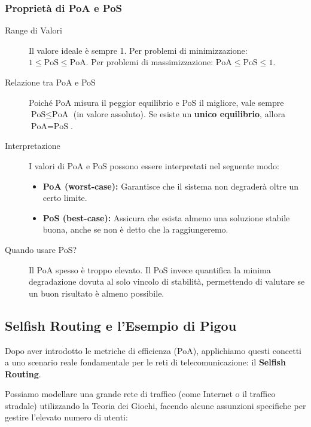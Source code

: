\subsubsection{Proprietà di PoA e PoS}

\begin{description}
    \item[Range di Valori] 
    Il valore ideale è sempre 1. Per problemi di minimizzazione: $1 \le \text{PoS} \le \text{PoA}$. Per problemi di massimizzazione: $\text{PoA} \le \text{PoS} \le 1$.
    
    \item[Relazione tra PoA e PoS]
    Poiché PoA misura il peggior equilibrio e PoS il migliore, vale sempre $\text{PoS} \le \text{PoA}$ (in valore assoluto). Se esiste un \textbf{unico equilibrio}, allora $\text{PoA} = \text{PoS}$.
    
    \item[Interpretazione] I valori di PoA e PoS possono essere interpretati nel seguente modo:
    \begin{itemize}
        \item \textbf{PoA (worst-case):} Garantisce che il sistema non degraderà oltre un certo limite.
        \item \textbf{PoS (best-case):} Assicura che esista almeno una soluzione stabile buona, anche se non è detto che la raggiungeremo.
    \end{itemize}
    
    \item[Quando usare PoS?]
    Il PoA spesso è troppo elevato. Il PoS invece quantifica la minima degradazione dovuta al solo vincolo di stabilità, permettendo di valutare se un buon risultato è almeno possibile.
\end{description}

\subsection{Selfish Routing e l'Esempio di Pigou}

Dopo aver introdotto le metriche di efficienza (PoA), applichiamo questi concetti a uno scenario reale fondamentale per le reti di telecomunicazione: il \textbf{Selfish Routing}.

Possiamo modellare una grande rete di traffico (come Internet o il traffico stradale) utilizzando la Teoria dei Giochi, facendo alcune assunzioni specifiche per gestire l'elevato numero di utenti:

